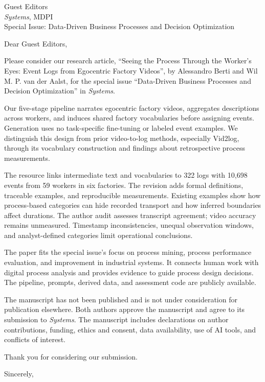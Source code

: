 \documentclass[11pt,a4paper]{letter}
\date{\today}
\begin{document}
\begin{letter}{Guest Editors\\\textit{Systems}, MDPI\\Special Issue: Data-Driven Business Processes and Decision Optimization}
\opening{Dear Guest Editors,}

Please consider our research article, ``Seeing the Process Through the Worker's Eyes: Event Logs from Egocentric Factory Videos'', by Alessandro Berti and Wil M. P. van der Aalst, for the special issue ``Data-Driven Business Processes and Decision Optimization'' in \textit{Systems}.

Our five-stage pipeline narrates egocentric factory videos, aggregates descriptions across workers, and induces shared factory vocabularies before assigning events. Generation uses no task-specific fine-tuning or labeled event examples. We distinguish this design from prior video-to-log methods, especially Vid2log, through its vocabulary construction and findings about retrospective process measurements.

The resource links intermediate text and vocabularies to 322 logs with 10,698 events from 59 workers in six factories. The revision adds formal definitions, traceable examples, and reproducible measurements. Existing examples show how process-based categories can hide recorded transport and how inferred boundaries affect durations. The author audit assesses transcript agreement; video accuracy remains unmeasured. Timestamp inconsistencies, unequal observation windows, and analyst-defined categories limit operational conclusions.

The paper fits the special issue's focus on process mining, process performance evaluation, and improvement in industrial systems. It connects human work with digital process analysis and provides evidence to guide process design decisions. The pipeline, prompts, derived data, and assessment code are publicly available.

The manuscript has not been published and is not under consideration for publication elsewhere. Both authors approve the manuscript and agree to its submission to \textit{Systems}. The manuscript includes declarations on author contributions, funding, ethics and consent, data availability, use of AI tools, and conflicts of interest.

Thank you for considering our submission.

\closing{Sincerely,}
\end{letter}
\end{document}
